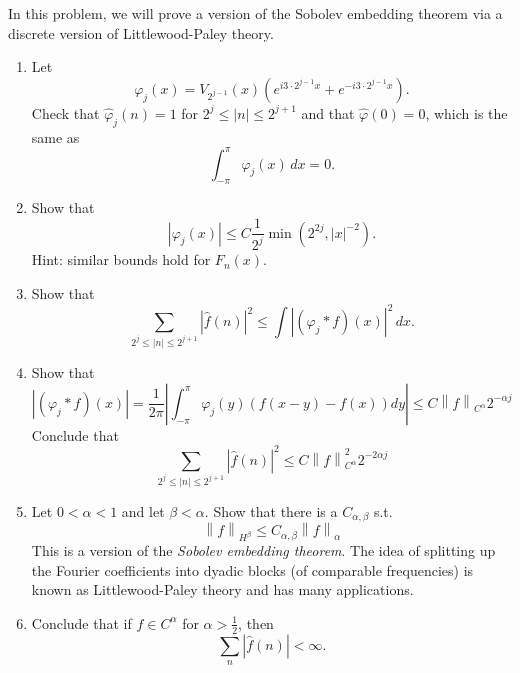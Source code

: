 \documentclass{article}
\newcommand{\norm}[1]{\left\|#1\right\|}
\theoremstyle{definition} %
\numberwithin{thm}{section} %
\theoremstyle{definition} %
\begin{document}
In this problem, we will prove a version of the Sobolev embedding theorem via a discrete version of Littlewood-Paley theory.
\begin{enumerate}[label=(\alph*)]
    \item  Let
\[
\varphi_j(x) = V_{2^{j-1}}(x)\left(e^{i 3 \cdot 2^{j-1} x} + e^{-i 3 \cdot 2^{j-1} x}\right).
\]
Check that $\hat{\varphi}_j(n) = 1$ for $2^j \leq |n| \leq 2^{j+1}$ and that $\hat{\varphi}(0) = 0$, which is the same as
\[
\int_{-\pi}^{\pi} \varphi_j(x) \,dx = 0.
\]

\item Show that
\[
|\varphi_j(x)| \leq C \frac{1}{2^j} \min(2^{2j}, |x|^{-2}).
\]
Hint: similar bounds hold for $F_n(x)$.

\item Show that
\[
\sum_{2^j \leq |n| \leq 2^{j+1}} |\hat{f}(n)|^2 \leq \int |(\varphi_j * f)(x)|^2 \,dx.
\]

\item Show that
\[
    |(\varphi_j * f)(x)| = \frac{1}{2\pi}\left|\int_{-\pi}^\pi
    \varphi_j(y)(f(x - y) - f(x))dy\right| 
    \leq C\norm{f}_{C^\alpha}2^{-\alpha j}
\]
Conclude that 
\[
    \sum_{2^j \leq |n| \leq 2^{j+1}} |\hat{f}(n)|^2 
    \leq C\norm{f}^2_{C^\alpha}2^{-2\alpha j}
\]

\item Let $0 < \alpha < 1$ and let $\beta < \alpha$. 
Show that there is a $C_{\alpha, \beta}$ s.t.
\[
    \norm{f}_{H^\beta} \leq C_{\alpha, \beta}\norm{f}_\alpha
\]
This is a version of the \textit{Sobolev embedding theorem}. 
The idea of splitting up the Fourier coefficients into dyadic 
blocks (of comparable frequencies) is known as
Littlewood-Paley theory and has many applications.

\item Conclude that if $f \in C^\alpha$ for $\alpha > \frac{1}{2}$, then
\[
\sum_n |\hat{f}(n)| < \infty.
\]
\end{enumerate}
\end{document}
